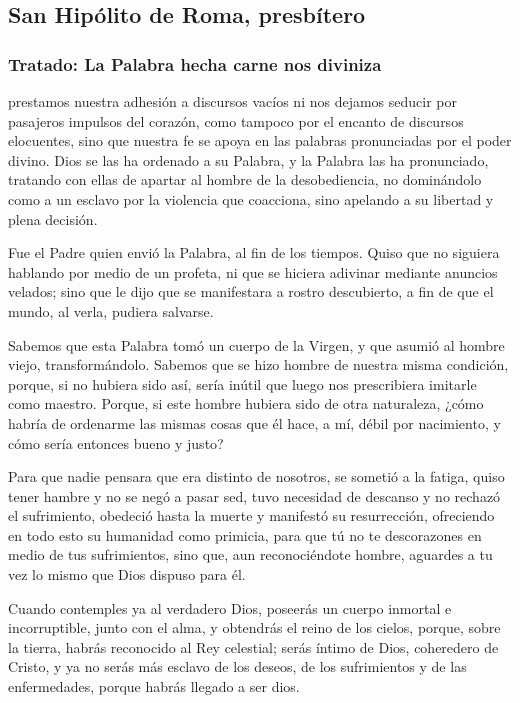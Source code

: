 \subsection{San Hipólito de Roma, presbítero}

\subsubsection{Tratado: La Palabra hecha carne nos diviniza}


\begin{body}
	 prestamos nuestra adhesión a discursos vacíos ni nos dejamos seducir por pasajeros impulsos del corazón, como tampoco por el encanto de discursos elocuentes, sino que nuestra fe se apoya en las palabras pronunciadas por el poder divino. Dios se las ha ordenado a su Palabra, y la Palabra las ha pronunciado, tratando con ellas de apartar al hombre de la desobediencia, no dominándolo como a un esclavo por la violencia que coacciona, sino apelando a su libertad y plena decisión.
	
	Fue el Padre quien envió la Palabra, al fin de los tiempos. Quiso que no siguiera hablando por medio de un profeta, ni que se hiciera adivinar mediante anuncios velados; sino que le dijo que se manifestara a rostro descubierto, a fin de que el mundo, al verla, pudiera salvarse.
	
	Sabemos que esta Palabra tomó un cuerpo de la Virgen, y que asumió al hombre viejo, transformándolo. Sabemos que se hizo hombre de nuestra misma condición, porque, si no hubiera sido así, sería inútil que luego nos prescribiera imitarle como maestro. Porque, si este hombre hubiera sido de otra naturaleza, ¿cómo habría de ordenarme las mismas cosas que él hace, a mí, débil por nacimiento, y cómo sería entonces bueno y justo?
	
	Para que nadie pensara que era distinto de nosotros, se sometió a la fatiga, quiso tener hambre y no se negó a pasar sed, tuvo necesidad de descanso y no rechazó el sufrimiento, obedeció hasta la muerte y manifestó su resurrección, ofreciendo en todo esto su humanidad como primicia, para que tú no te descorazones en medio de tus sufrimientos, sino que, aun reconociéndote hombre, aguardes a tu vez lo mismo que Dios dispuso para él.
	
	Cuando contemples ya al verdadero Dios, poseerás un cuerpo inmortal e incorruptible, junto con el alma, y obtendrás el reino de los cielos, porque, sobre la tierra, habrás reconocido al Rey celestial; serás íntimo de Dios, coheredero de Cristo, y ya no serás más esclavo de los deseos, de los sufrimientos y de las enfermedades, porque habrás llegado a ser dios.
	

\end{body}

